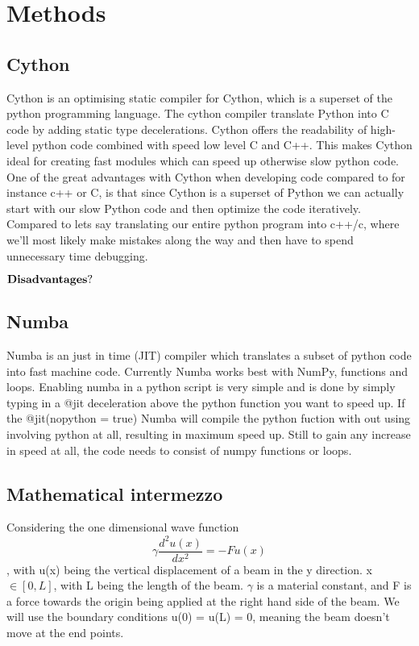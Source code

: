 \section{Methods}

\subsection*{Cython}
Cython is an optimising static compiler for Cython, which is a superset of the
python programming language. The cython compiler translate Python into C code by
adding static type decelerations. Cython offers the readability of high-level
python code combined with speed low level C and C++. This makes Cython ideal for
creating fast modules which can speed up otherwise slow python code. One of the
great advantages with Cython when developing code compared to for instance c++
or C, is that since Cython is a superset of Python we can actually start with
our slow Python code and then optimize the code iteratively. Compared to lets
say translating our entire python program into c++/c, where we'll most likely
make mistakes along the way and then have to spend unnecessary time debugging. 

$\bf{Disadvantages?}$

\subsection*{Numba}
Numba is an just in time (JIT) compiler which translates a subset of python code
into fast machine code. Currently Numba works best with NumPy, functions
and loops. Enabling numba in a python script is very simple and is done by
simply typing in a @jit deceleration above the python function you want to speed
up. If the @jit(nopython = true) Numba will compile the python fuction with out
using involving python at all, resulting in maximum speed up. Still to gain any increase in speed at all, the code needs to consist of
numpy functions or loops.     


\subsection*{Mathematical intermezzo}
Considering the one dimensional wave function
\begin{equation}
\gamma \frac{d^2 u(x)}{dx^2} = -F u(x)
\end{equation}
, with u(x) being the vertical displacement of a beam in the y direction.
x $\in [0, L]$, with L being the length of the beam. $\gamma$ is a material constant,
and F is a force towards the origin being applied at the right hand side of the beam.
We will use the boundary conditions u(0) = u(L) = 0, meaning the beam doesn't move
at the end points.


